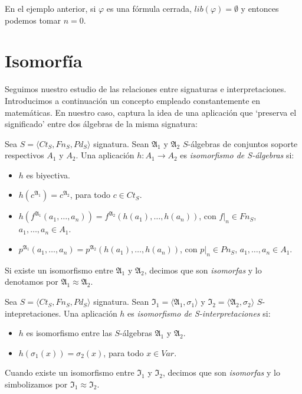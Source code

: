 \begin{example}
En el ejemplo anterior, si $\varphi$ es una fórmula cerrada, $lib(\varphi) = \emptyset$ y entonces podemos tomar $n=0$.
\end{example}


\section{Isomorfía}

Seguimos nuestro estudio de las relaciones entre signaturas e interpretaciones. Introducimos a continuación un concepto empleado constantemente en matemáticas. En nuestro caso, captura la idea de una aplicación que `preserva el significado' entre dos álgebras de la misma signatura:

\begin{definition}
Sea $S = \langle Ct_{S}, Fn_{S}, Pd_{S}\rangle$ signatura. Sean $\mathfrak{A}_1$ y $\mathfrak{A}_2$ $S$-álgebras de conjuntos soporte respectivos $A_1$ y $A_2$. Una aplicación $h: A_1 \rightarrow A_2$ es \textit{isomorfismo de S-álgebras} si:
\begin{itemize}
    \item $h$ es biyectiva.
    \item $h(c^{\mathfrak{A}_1}) = c^{\mathfrak{A}_2}$, para todo $c \in Ct_S$.
    \item $h(f^{\mathfrak{A}_1}(a_1, \dots, a_n)) = f^{\mathfrak{A}_2}(h(a_1), \dots, h(a_n))$, con $f|_n \in Fn_S$, $a_1, \dots, a_n \in A_1$.
    \item $p^{\mathfrak{A}_1}(a_1, \dots, a_n) = p^{\mathfrak{A}_2}(h(a_1), \dots, h(a_n))$, con $p|_n \in Pn_S$, $a_1, \dots, a_n \in A_1$.
\end{itemize}
Si existe un isomorfismo entre $\mathfrak{A}_1$ y $\mathfrak{A}_2$, decimos que son \textit{isomorfas} y lo denotamos por $\mathfrak{A}_1 \approx \mathfrak{A}_2$.
\end{definition}

\begin{definition}
Sea $S = \langle Ct_{S}, Fn_{S}, Pd_{S}\rangle$ signatura. Sean $\mathfrak{I}_1 = \langle \mathfrak{A}_1, \sigma_1 \rangle$ y $\mathfrak{I}_2 = \langle \mathfrak{A}_2, \sigma_2 \rangle$ $S$-intepretaciones. Una aplicación $h$ es \textit{isomorfismo de S-interpretaciones} si:
\begin{itemize}
    \item $h$ es isomorfismo entre las $S$-álgebras $\mathfrak{A}_1$ y $\mathfrak{A}_2$.
    \item $h(\sigma_1(x)) = \sigma_2(x)$, para todo $x \in Var$.
\end{itemize}
Cuando existe un isomorfismo entre $\mathfrak{I}_1$ y $\mathfrak{I}_2$, decimos que son \textit{isomorfas} y lo simbolizamos por $\mathfrak{I}_1 \approx \mathfrak{I}_2$.
\end{definition}


